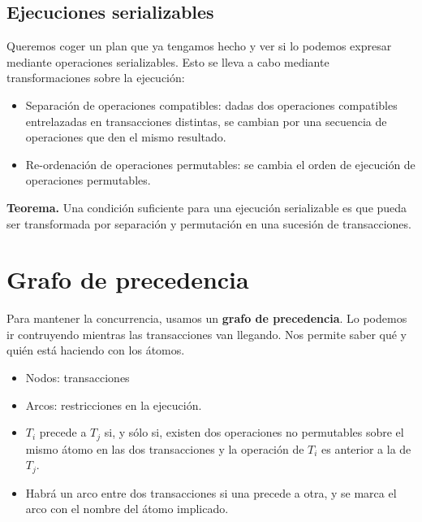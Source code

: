 \subsection{Ejecuciones serializables}

Queremos coger un plan que ya tengamos hecho y ver si lo podemos expresar mediante operaciones serializables. Esto se lleva a cabo mediante transformaciones sobre la ejecución:
\begin{itemize}
\item Separación de operaciones compatibles: dadas dos operaciones compatibles entrelazadas en transacciones distintas, se cambian por una secuencia de operaciones que den el mismo resultado.
\item Re-ordenación de operaciones permutables: se cambia el orden de ejecución de operaciones permutables. 
\end{itemize}

\textbf{Teorema.} Una condición suficiente para una ejecución serializable es que pueda ser transformada por separación y permutación en una sucesión de transacciones.

\section{Grafo de precedencia}

Para mantener la concurrencia, usamos un \textbf{grafo de precedencia}. Lo podemos ir contruyendo mientras las transacciones van llegando. Nos permite saber qué y quién está haciendo con los átomos.

\begin{itemize}
\item Nodos: transacciones
\item Arcos: restricciones en la ejecución.
\item $T_i$ precede a $T_j$ si, y sólo si, existen dos operaciones no permutables sobre el mismo átomo en las dos transacciones y la operación de $T_i$ es anterior a la de $T_j$.
\item Habrá un arco entre dos transacciones si una precede a otra, y se marca el arco con el nombre del átomo implicado.
\end{itemize}

